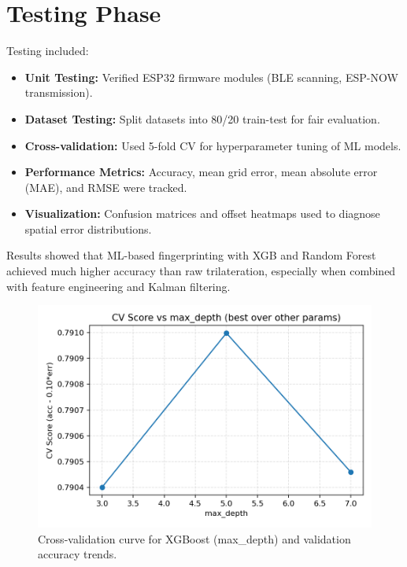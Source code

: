 \documentclass[a4paper,12pt]{report}
\begin{document}
\section{Testing Phase}
Testing included:
\begin{itemize}
    \item \textbf{Unit Testing:} Verified ESP32 firmware modules (BLE scanning, ESP-NOW transmission).
    \item \textbf{Dataset Testing:} Split datasets into 80/20 train-test for fair evaluation.
    \item \textbf{Cross-validation:} Used 5-fold CV for hyperparameter tuning of ML models.
    \item \textbf{Performance Metrics:} Accuracy, mean grid error, mean absolute error (MAE), and RMSE were tracked.
    \item \textbf{Visualization:} Confusion matrices and offset heatmaps used to diagnose spatial error distributions.
\end{itemize}

Results showed that ML-based fingerprinting with XGB and Random Forest achieved much higher accuracy than raw trilateration, especially when combined with feature engineering and Kalman filtering.

\begin{figure}[H]
    \centering
    \includegraphics[width=\textwidth]{figures/training_cv_curves.png}
    \caption{Cross-validation curve for XGBoost (max\_depth) and validation accuracy trends.}
    \label{fig:cv_curves}
\end{figure}
\end{document}
